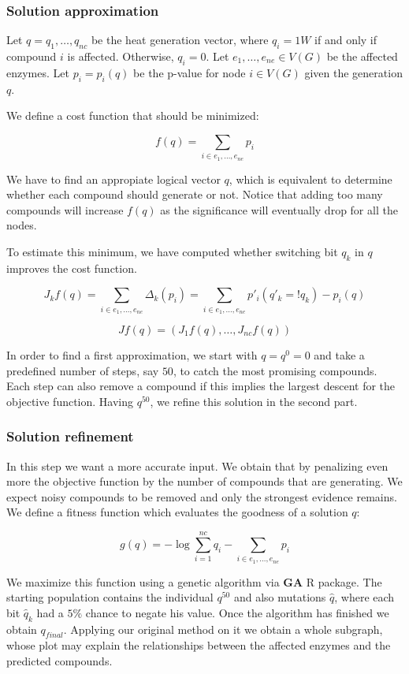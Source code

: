 \documentclass{article}\usepackage[]{graphicx}\usepackage[]{color}
\begin{document}
\subsubsection{Solution approximation}

Let $q = q_1, \ldots, q_{nc}$ be the heat generation vector, where $q_i = 1W$ 
if and only if compound $i$ is affected. Otherwise, $q_i = 0$.
Let $e_1, \ldots, e_{ne} \in V(G)$ be the affected enzymes. Let $p_i = p_i(q)$ 
be the p-value for node $i \in V(G)$ given the generation $q$.

We define a cost function that should be minimized:

$$f(q) = \sum_{i \in e_1, \ldots, e_{ne}} p_i$$

We have to find an appropiate logical vector $q$, which is equivalent to determine
whether each compound should generate or not. Notice that adding too many compounds 
will increase $f(q)$ as the significance will eventually drop for all the nodes.

To estimate this minimum, we have computed whether switching bit $q_k$ in $q$ 
improves the cost function. 

$$
J_k f(q) = \sum_{i \in e_1, \ldots, e_{ne}} \Delta _k (p_i) = \sum_{i \in e_1, \ldots, e_{ne}} p'_i(q'_k = ! q_k) - p_i(q)
$$

$$
J f(q) = (J_1 f(q), \ldots, J_{nc} f(q) )
$$

In order to find a first approximation, we start with $q = q^0 = 0$ and take a 
predefined number of steps, say $50$, to catch the most promising compounds. 
Each step can also remove a compound if this implies the largest descent for the 
objective function. Having $q^{50}$, we refine this solution in the second part.

\subsubsection{Solution refinement}

In this step we want a more accurate input. We obtain that by penalizing even more 
the objective function by the number of compounds that are generating. We expect noisy compounds to be removed and only the strongest evidence remains. We define a fitness 
function which evaluates the goodness of a solution $q$:

$$ g(q) = -\log{  \sum_{i = 1}^{nc} q_i }  -  \sum_{i \in e_1, \ldots, e_{ne}} p_i  $$

We maximize this function using a genetic algorithm via \textbf{GA} R package. 
The starting population contains the individual $q^{50}$ and also mutations $\hat{q}$, where 
each bit $\hat{q}_k$ had a $5\%$ chance to negate his value.
Once the algorithm has finished we obtain $q_{final}$. Applying our original method 
on it we obtain a whole subgraph, whose plot may explain the relationships 
between the affected enzymes and the predicted compounds.
\end{document}
